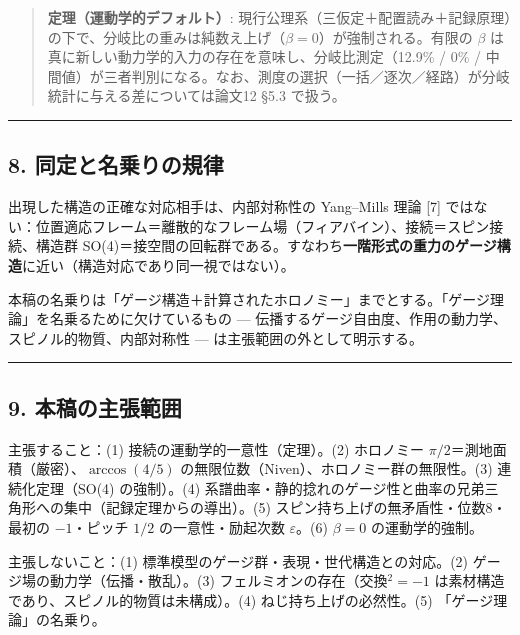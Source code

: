 \documentclass[
]{ltjsarticle}
\begin{document}
\begin{quote}
\textbf{定理（運動学的デフォルト）}:
現行公理系（三仮定＋配置読み＋記録原理）の下で、分岐比の重みは純数え上げ（\(\beta=0\)）が強制される。有限の
\(\beta\) は真に新しい動力学的入力の存在を意味し、分岐比測定（12.9\% /
0\% /
中間値）が三者判別になる。なお、測度の選択（一括／逐次／経路）が分岐統計に与える差については論文12
§5.3 で扱う。
\end{quote}

\begin{center}\rule{0.5\linewidth}{0.5pt}\end{center}

\subsection{8.
同定と名乗りの規律}\label{ux540cux5b9aux3068ux540dux4e57ux308aux306eux898fux5f8b}

出現した構造の正確な対応相手は、内部対称性の Yang--Mills 理論 {[}7{]}
ではない：位置適応フレーム＝離散的なフレーム場（フィアバイン）、接続＝スピン接続、構造群
SO(4)＝接空間の回転群である。すなわち\textbf{一階形式の重力のゲージ構造}に近い（構造対応であり同一視ではない）。

本稿の名乗りは「ゲージ構造＋計算されたホロノミー」までとする。「ゲージ理論」を名乗るために欠けているもの
--- 伝播するゲージ自由度、作用の動力学、スピノル的物質、内部対称性 ---
は主張範囲の外として明示する。

\begin{center}\rule{0.5\linewidth}{0.5pt}\end{center}

\subsection{9.
本稿の主張範囲}\label{ux672cux7a3fux306eux4e3bux5f35ux7bc4ux56f2}

主張すること：(1) 接続の運動学的一意性（定理）。(2) ホロノミー
\(\pi/2\)＝測地面積（厳密）、\(\arccos(4/5)\)
の無限位数（Niven）、ホロノミー群の無限性。(3) 連続化定理（SO(4)
の強制）。(4)
系譜曲率・静的捻れのゲージ性と曲率の兄弟三角形への集中（記録定理からの導出）。(5)
スピン持ち上げの無矛盾性・位数8・最初の \(-1\)・ピッチ \(1/2\)
の一意性・励起次数 \(\varepsilon\)。(6) \(\beta=0\) の運動学的強制。

主張しないこと：(1) 標準模型のゲージ群・表現・世代構造との対応。(2)
ゲージ場の動力学（伝播・散乱）。(3) フェルミオンの存在（交換\(^2=-1\)
は素材構造であり、スピノル的物質は未構成）。(4)
ねじ持ち上げの必然性。(5) 「ゲージ理論」の名乗り。
\end{document}
